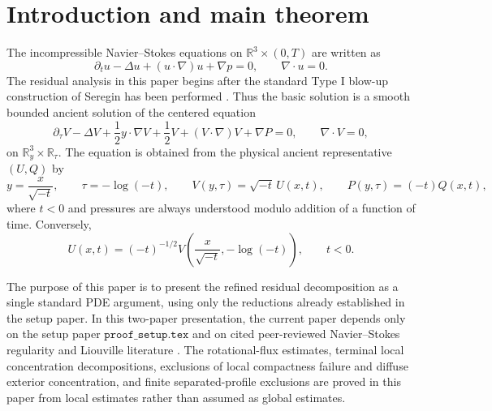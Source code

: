 \documentclass[11pt]{amsart}
\numberwithin{equation}{section}
\theoremstyle{plain}
\theoremstyle{definition}
\theoremstyle{remark}
\newcommand{\R}{\mathbb R}
\begin{document}
\maketitle
\tableofcontents

\section{Introduction and main theorem}
\label{sec:introduction}

The incompressible Navier--Stokes equations on
\(\R^3\times(0,T)\) are written as
\begin{equation}\label{eq:NS-physical}
   \partial_tu-\Delta u+(u\cdot\nabla)u+\nabla p=0,
   \qquad \nabla\cdot u=0 .
\end{equation}
The residual analysis in this paper begins after the standard Type I blow-up
construction of Seregin has been performed \cite{Seregin2012}.  Thus the basic solution is a smooth bounded
ancient solution of the centered equation
\begin{equation}\label{eq:centered-main}
   \partial_\tau V-\Delta V+\frac12 y\cdot\nabla V+\frac12 V
   +(V\cdot\nabla)V+\nabla P=0,
   \qquad \nabla\cdot V=0 ,
\end{equation}
on \(\R^3_y\times\R_\tau\).  The equation is obtained from the physical
ancient representative \((U,Q)\) by
\begin{equation}\label{eq:centered-transform}
   y=\frac{x}{\sqrt{-t}},\qquad
   \tau=-\log(-t),\qquad
   V(y,\tau)=\sqrt{-t}\,U(x,t),
   \qquad
   P(y,\tau)=(-t)Q(x,t),
\end{equation}
where \(t<0\) and pressures are always understood modulo addition of a
function of time.  Conversely,
\begin{equation}\label{eq:physical-pullback-main}
   U(x,t)=(-t)^{-1/2}
   V\!\left(\frac{x}{\sqrt{-t}},-\log(-t)\right),
   \qquad t<0 .
\end{equation}

The purpose of this paper is to present the refined residual decomposition as a
single standard PDE argument, using only the reductions already established in
the setup paper.  In this two-paper presentation, the current paper depends
only on the setup paper \(\texttt{proof\_setup.tex}\) and on cited
peer-reviewed Navier--Stokes regularity and Liouville literature
\cite{KNSS2009,Seregin2012}.  The
rotational-flux estimates, terminal local concentration decompositions,
exclusions of local compactness failure and diffuse exterior concentration, and
finite separated-profile exclusions are proved in this paper from local
estimates rather than assumed as global estimates.
\end{document}
